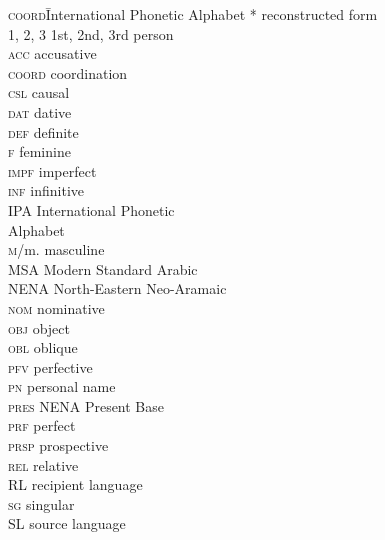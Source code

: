 \documentclass[output=paper]{langsci/langscibook}
\begin{document}
\begin{multicols}{2}
\begin{tabbing}
\textsc{coord}\hspace{2\tabcolsep}\= International Phonetic Alphabet\kill
*  \>  reconstructed form\\
\textsc{1, 2, 3} \> 1st, 2nd, 3rd person \\
\textsc{acc} \> accusative\\
\textsc{coord} \> {coordination}\\
\textsc{csl} \> causal \\
\textsc{dat} \> dative\\
\textsc{def} \> {definite}\\
\textsc{f} \> feminine\\
\textsc{impf} \> imperfect\\
\textsc{inf} \> {infinitive}\\
IPA \> International Phonetic \\ \> Alphabet\\
\textsc{m}/m. \> masculine\\
MSA \> Modern Standard Arabic\\
NENA \> North-Eastern Neo-Aramaic\\
\textsc{nom} \> nominative\\
\textsc{obj} \> object \\
\textsc{obl} \> oblique \\
\textsc{pfv} \> perfective\\
\textsc{pn} \> personal name \\
\textsc{pres}    \> NENA Present Base \\
\textsc{prf} \> perfect\\
\textsc{prsp} \> {prospective}\\
\textsc{rel} \> {relative}\\
{RL} \> {recipient language}\\
\textsc{sg} \> singular\\
{SL} \> {source language}\\
\end{tabbing}%
\end{multicols}


\sloppy
\printbibliography[heading=subbibliography,notkeyword=this]
\end{document}
